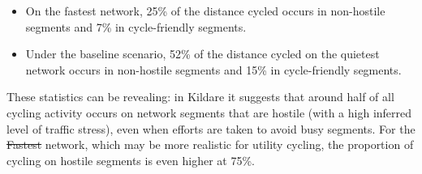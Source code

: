 \documentclass[
  super,
  preprint,
  3p]{elsarticle}
\providecommand{\DIFadd}[1]{{\protect\color{blue}\uwave{#1}}} %
\providecommand{\DIFdel}[1]{{\protect\color{red}\sout{#1}}}                      %
\providecommand{\DIFaddbegin}{} %
\providecommand{\DIFaddend}{} %
\providecommand{\DIFdelbegin}{} %
\providecommand{\DIFdelend}{} %
\newcommand{\DIFscaledelfig}{0.5}
\newlength{\DIFdelgraphicswidth} %
\newlength{\DIFdelgraphicsheight} %
\newcommand{\DIFaddincludegraphics}[2][]{{\color{blue}\fbox{\DIFOincludegraphics[#1]{#2}}}} %
\newcommand{\DIFdelincludegraphics}[2][]{%
\sbox{\DIFdelgraphicsbox}{\DIFOincludegraphics[#1]{#2}}%
\settoboxwidth{\DIFdelgraphicswidth}{\DIFdelgraphicsbox} %
\settoboxtotalheight{\DIFdelgraphicsheight}{\DIFdelgraphicsbox} %
\scalebox{\DIFscaledelfig}{%
\parbox[b]{\DIFdelgraphicswidth}{\usebox{\DIFdelgraphicsbox}\\[-\baselineskip] \rule{\DIFdelgraphicswidth}{0em}}\llap{\resizebox{\DIFdelgraphicswidth}{\DIFdelgraphicsheight}{%
\setlength{\unitlength}{\DIFdelgraphicswidth}%
\begin{picture}(1,1)%
\thicklines\linethickness{2pt} %
{\color[rgb]{1,0,0}\put(0,0){\framebox(1,1){}}}%
{\color[rgb]{1,0,0}\put(0,0){\line( 1,1){1}}}%
{\color[rgb]{1,0,0}\put(0,1){\line(1,-1){1}}}%
\end{picture}%
}\hspace*{3pt}}} %
} %
\DeclareRobustCommand{\DIFaddbegin}{\DIFOaddbegin \let\includegraphics\DIFaddincludegraphics} %
\DeclareRobustCommand{\DIFaddend}{\DIFOaddend \let\includegraphics\DIFOincludegraphics} %
\DeclareRobustCommand{\DIFdelbegin}{\DIFOdelbegin \let\includegraphics\DIFdelincludegraphics} %
\DeclareRobustCommand{\DIFdelend}{\DIFOaddend \let\includegraphics\DIFOincludegraphics} %
\begin{document}
\begin{itemize}
\item
  On the fastest network, 25\% of the distance cycled occurs in
  non-hostile segments and 7\% in cycle-friendly segments.
\item
  Under the baseline scenario, 52\% of the distance cycled on the
  quietest network occurs in non-hostile segments and 15\% in
  cycle-friendly segments.
\end{itemize}

These statistics can be revealing: in Kildare it suggests that around
half of all cycling activity occurs on network segments that are hostile
(with a high inferred level of traffic stress), even when efforts are
taken to avoid busy segments. For the \DIFdelbegin \DIFdel{Fastest }\DIFdelend \DIFaddbegin \DIFadd{fastest }\DIFaddend network, which may be more
realistic for utility cycling, the proportion of cycling on hostile
segments is even higher at 75\%.
\end{document}
